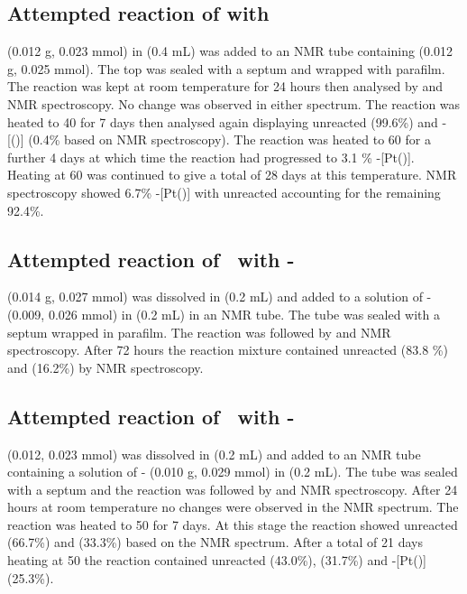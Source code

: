 \subsection*{Attempted reaction of \tButhixantphos{} with }

\tButhixantphos{} (0.012 g, 0.023 mmol) in  (0.4 mL) was added to an NMR tube containing  (0.012 g, 0.025 mmol).  The top was sealed with a septum and wrapped with parafilm.  The reaction was kept at room temperature for 24 hours then analysed by \proton{} and \phosphorus{} NMR spectroscopy.  No change was observed in either spectrum.  The reaction was heated to 40 \degC{} for 7 days then analysed again displaying unreacted \tButhixantphos{} (99.6\%) and \trans-[(\tButhixantphos)] (0.4\% based on \phosphorus{} NMR spectroscopy).  The reaction was heated to 60 \degC{} for a further 4 days at which time the reaction had progressed to 3.1 \% \trans-[Pt(\tButhixantphos)].  Heating at 60 \degC{} was continued to give a total of 28 days at this temperature.  NMR spectroscopy showed 6.7\% \trans-[Pt(\tButhixantphos)] with unreacted \tButhixantphos{} accounting for the remaining 92.4\%.

\subsection*{Attempted reaction of \tButhixantphos\ with \cis-}

\tButhixantphos{} (0.014 g, 0.027 mmol) was dissolved in  (0.2 mL) and added to a solution of \cis- (0.009, 0.026 mmol) in  (0.2 mL) in an NMR tube.  The tube was sealed with a septum wrapped in parafilm.  The reaction was followed by \proton{} and \phosphorus{} NMR spectroscopy.  After 72 hours the reaction mixture contained unreacted \tButhixantphos{} (83.8 \%) and \tButhixantphos{}  (16.2\%) by \phosphorus{} NMR spectroscopy.  

\subsection*{Attempted reaction of \tButhixantphos\ with \trans-}

\tButhixantphos{} (0.012, 0.023 mmol) was dissolved in  (0.2 mL) and added to an NMR tube containing a solution of \trans- (0.010 g, 0.029 mmol) in  (0.2 mL). The tube was sealed with a septum and the reaction was followed by \proton{} and \phosphorus{} NMR spectroscopy.  After 24 hours at room temperature no changes were observed in the NMR spectrum.  The reaction was heated to 50 \degC for 7 days.  At this stage the reaction showed unreacted \tButhixantphos{} (66.7\%) and \tButhixantphos{} (33.3\%) based on the \phosphorus{} NMR spectrum.  After a total of 21 days heating at 50 \degC the reaction contained unreacted \tButhixantphos{} (43.0\%), \tButhixantphos{} (31.7\%) and \trans-[Pt(\tButhixantphos)] (25.3\%).  

